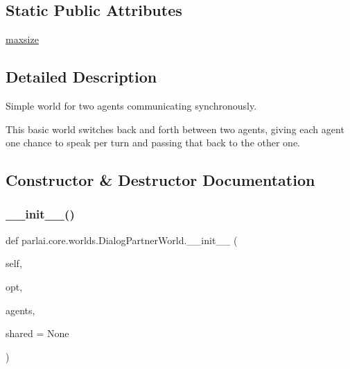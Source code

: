 \subsection*{Static Public Attributes}
\begin{DoxyCompactItemize}
\item 
\hyperlink{classparlai_1_1core_1_1worlds_1_1DialogPartnerWorld_acae28d33fb7d494b7df84d0f8c57eb23}{maxsize}
\end{DoxyCompactItemize}


\subsection{Detailed Description}
\begin{DoxyVerb}Simple world for two agents communicating synchronously.

This basic world switches back and forth between two agents, giving each agent one
chance to speak per turn and passing that back to the other one.
\end{DoxyVerb}
 

\subsection{Constructor \& Destructor Documentation}
\mbox{\label{classparlai_1_1core_1_1worlds_1_1DialogPartnerWorld_a21ea86d832ae73e670fcfbaea943e1c0}} 
\subsubsection{\texorpdfstring{\+\_\+\+\_\+init\+\_\+\+\_\+()}{\_\_init\_\_()}}
{\footnotesize\ttfamily def parlai.\+core.\+worlds.\+Dialog\+Partner\+World.\+\_\+\+\_\+init\+\_\+\+\_\+ (\begin{DoxyParamCaption}\item[{}]{self,  }\item[{}]{opt,  }\item[{}]{agents,  }\item[{}]{shared = {\ttfamily None} }\end{DoxyParamCaption})}



